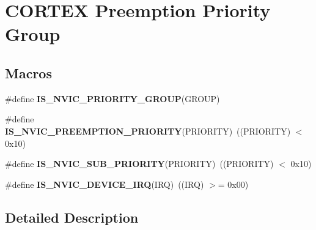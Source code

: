 \hypertarget{group___c_o_r_t_e_x___preemption___priority___group___macro}{\section{C\-O\-R\-T\-E\-X Preemption Priority Group}
\label{group___c_o_r_t_e_x___preemption___priority___group___macro}
}
\subsection*{Macros}
\begin{DoxyCompactItemize}
\item 
\#define {\bfseries I\-S\-\_\-\-N\-V\-I\-C\-\_\-\-P\-R\-I\-O\-R\-I\-T\-Y\-\_\-\-G\-R\-O\-U\-P}(G\-R\-O\-U\-P)
\item 
\hypertarget{group___c_o_r_t_e_x___preemption___priority___group___macro_gaf30fd8f5960c2e28a772d8f16bb156dd}{\#define {\bfseries I\-S\-\_\-\-N\-V\-I\-C\-\_\-\-P\-R\-E\-E\-M\-P\-T\-I\-O\-N\-\_\-\-P\-R\-I\-O\-R\-I\-T\-Y}(P\-R\-I\-O\-R\-I\-T\-Y)~((P\-R\-I\-O\-R\-I\-T\-Y) $<$ 0x10)}\label{group___c_o_r_t_e_x___preemption___priority___group___macro_gaf30fd8f5960c2e28a772d8f16bb156dd}

\item 
\hypertarget{group___c_o_r_t_e_x___preemption___priority___group___macro_ga010705bc997dcff935b965b372cba61d}{\#define {\bfseries I\-S\-\_\-\-N\-V\-I\-C\-\_\-\-S\-U\-B\-\_\-\-P\-R\-I\-O\-R\-I\-T\-Y}(P\-R\-I\-O\-R\-I\-T\-Y)~((P\-R\-I\-O\-R\-I\-T\-Y) $<$ 0x10)}\label{group___c_o_r_t_e_x___preemption___priority___group___macro_ga010705bc997dcff935b965b372cba61d}

\item 
\hypertarget{group___c_o_r_t_e_x___preemption___priority___group___macro_ga9b8dcac4ed8e88c14d9bb04e369dad6a}{\#define {\bfseries I\-S\-\_\-\-N\-V\-I\-C\-\_\-\-D\-E\-V\-I\-C\-E\-\_\-\-I\-R\-Q}(I\-R\-Q)~((I\-R\-Q) $>$= 0x00)}\label{group___c_o_r_t_e_x___preemption___priority___group___macro_ga9b8dcac4ed8e88c14d9bb04e369dad6a}

\end{DoxyCompactItemize}


\subsection{Detailed Description}


